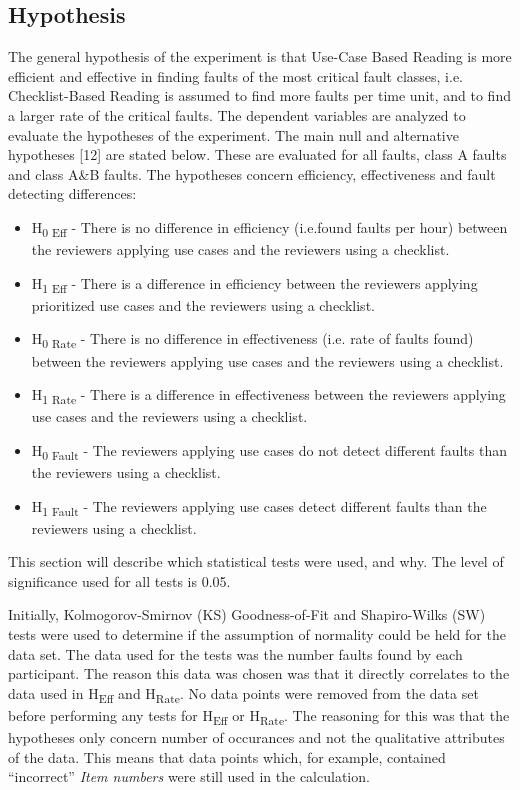 \documentclass[10pt,twocolumn]{article}
\begin{document}
\subsection{Hypothesis}
The general hypothesis of the experiment is that Use-Case
Based Reading is more efficient and effective in finding faults
of the most critical fault classes, i.e. Checklist-Based Reading
is assumed to find more faults per time unit, and to find a
larger rate of the critical faults.
The dependent variables are analyzed to evaluate the
hypotheses of the experiment. The main null and alternative
hypotheses [12] are stated below. These are evaluated for all
faults, class A faults and class A\&B faults. The hypotheses
concern efficiency, effectiveness and fault detecting
differences:
\begin{itemize}
\item H\textsubscript{0 Eff} - There is no difference in efficiency (i.e.found faults per hour) between the reviewers applying use cases and the reviewers using a checklist.
\item H\textsubscript{1 Eff} - There is a difference in efficiency between the reviewers applying prioritized use cases and the reviewers using a checklist.
\item H\textsubscript{0 Rate} - There is no difference in effectiveness (i.e. rate of faults found) between the reviewers applying use cases and the reviewers using a checklist.
\item H\textsubscript{1 Rate} - There is a difference in effectiveness between the reviewers applying use cases and the reviewers using a checklist.
\item H\textsubscript{0 Fault} - The reviewers applying use cases do not detect different faults than the reviewers using a checklist.
\item H\textsubscript{1 Fault} - The reviewers applying use cases detect different faults than the reviewers using a checklist.

\end{itemize}

This section will describe which statistical tests were used, and why. The level of significance used for all tests is 0.05. 

Initially, Kolmogorov-Smirnov (KS) Goodness-of-Fit and Shapiro-Wilks (SW) tests were used to determine if the assumption of normality could be held for the data set. The data used for the tests was the number faults found by each participant. The reason this data was chosen was that it directly correlates to the data used in H\textsubscript{Eff} and H\textsubscript{Rate}. No data points were removed from the data set before performing any tests for H\textsubscript{Eff} or H\textsubscript{Rate}. The reasoning for this was that the hypotheses only concern number of occurances and not the qualitative attributes of the data. This means that data points which, for example, contained ``incorrect'' \textit{Item numbers} were still used in the calculation.
\end{document}
